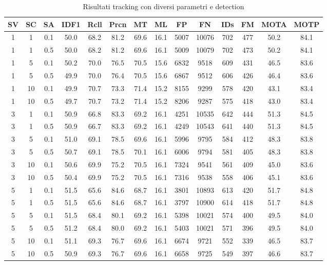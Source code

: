 \begin{table}[h!]
\centering
\begin{tabular}{|c|c|c|c|c|c|c|c|c|c|c|c|c|c|}
\hline
SV & SC & SA & IDF1 & Rcll & Prcn & MT & ML & FP & FN & IDs & FM & MOTA & MOTP\\ [0.5ex] 
\hline
1 & 1 & 0.1 & 50.0 & 68.2 & 81.2 & 69.6 & 16.1 & 5007 & 10076 & 702 & 477 & 50.2 & 84.1\\
1 & 1 & 0.5 & 50.0 & 68.2 & 81.2 & 69.6 & 16.1 & 5009 & 10079 & 702 & 473 & 50.2 & 84.1\\
1 & 5 & 0.1 & 50.2 & 70.0 & 76.5 & 70.5 & 15.6 & 6832 & 9518 & 609 & 431 & 46.5 & 83.6\\
1 & 5 & 0.5 & 49.9 & 70.0 & 76.4 & 70.5 & 15.6 & 6867 & 9512 & 606 & 426 & 46.4 & 83.6\\
1 & 10 & 0.1 & 49.9 & 70.7 & 73.3 & 71.4 & 15.2 & 8155 & 9299 & 578 & 420 & 43.1 & 83.4\\
1 & 10 & 0.5 & 49.7 & 70.7 & 73.2 & 71.4 & 15.2 & 8206 & 9287 & 575 & 418 & 43.0 & 83.4\\
3 & 1 & 0.1 & 50.9 & 66.8 & 83.3 & 69.2 & 16.1 & 4251 & 10535 & 642 & 444 & 51.3 & 84.5\\
3 & 1 & 0.5 & 50.9 & 66.7 & 83.3 & 69.2 & 16.1 & 4249 & 10543 & 641 & 440 & 51.3 & 84.5\\
3 & 5 & 0.1 & 51.0 & 69.1 & 78.5 & 69.6 & 16.1 & 5996 & 9795 & 584 & 412 & 48.3 & 83.8\\
3 & 5 & 0.5 & 50.7 & 69.1 & 78.5 & 70.1 & 16.1 & 6006 & 9794 & 581 & 405 & 48.3 & 83.8\\
3 & 10 & 0.1 & 50.6 & 69.9 & 75.2 & 70.5 & 16.1 & 7324 & 9541 & 561 & 409 & 45.0 & 83.6\\
3 & 10 & 0.5 & 50.4 & 69.9 & 75.2 & 70.5 & 16.1 & 7316 & 9538 & 558 & 406 & 45.1 & 83.6\\
5 & 1 & 0.1 & 51.5 & 65.6 & 84.6 & 68.7 & 16.1 & 3801 & 10893 & 613 & 420 & 51.7 & 84.8\\
5 & 1 & 0.5 & 51.5 & 65.6 & 84.6 & 68.7 & 16.1 & 3797 & 10900 & 614 & 418 & 51.7 & 84.8\\
5 & 5 & 0.1 & 51.5 & 68.4 & 80.1 & 69.2 & 16.1 & 5398 & 10021 & 574 & 400 & 49.5 & 84.0\\
5 & 5 & 0.5 & 51.2 & 68.4 & 80.0 & 69.2 & 16.1 & 5403 & 10021 & 571 & 396 & 49.5 & 84.0\\
5 & 10 & 0.1 & 51.1 & 69.3 & 76.7 & 69.6 & 16.1 & 6674 & 9721 & 552 & 339 & 46.5 & 83.7\\
5 & 10 & 0.5 & 50.9 & 69.3 & 76.7 & 69.6 & 16.1 & 6658 & 9725 & 549 & 397 & 46.6 & 83.7\\
\hline
\end{tabular}
\caption{Risultati tracking con diversi parametri e detection}
\label{risultati tracking con diversi parametri e detection}
\end{table}

